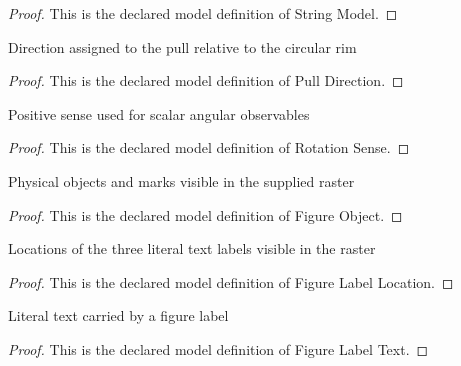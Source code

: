 \begin{proof}
  This is the declared model definition of String Model.
\end{proof}
\begin{definition}
  \label{def:physics:phyx-mini-0772:phyxminiproblems-problemphyxmini0772-pulldirection}
  Direction assigned to the pull relative to the circular rim
\end{definition}
\begin{proof}
  This is the declared model definition of Pull Direction.
\end{proof}
\begin{definition}
  \label{def:physics:phyx-mini-0772:phyxminiproblems-problemphyxmini0772-rotationsense}
  Positive sense used for scalar angular observables
\end{definition}
\begin{proof}
  This is the declared model definition of Rotation Sense.
\end{proof}
\begin{definition}
  \label{def:physics:phyx-mini-0772:phyxminiproblems-problemphyxmini0772-figureobject}
  Physical objects and marks visible in the supplied raster
\end{definition}
\begin{proof}
  This is the declared model definition of Figure Object.
\end{proof}
\begin{definition}
  \label{def:physics:phyx-mini-0772:phyxminiproblems-problemphyxmini0772-figurelabellocation}
  Locations of the three literal text labels visible in the raster
\end{definition}
\begin{proof}
  This is the declared model definition of Figure Label Location.
\end{proof}
\begin{definition}
  \label{def:physics:phyx-mini-0772:phyxminiproblems-problemphyxmini0772-figurelabeltext}
  Literal text carried by a figure label
\end{definition}
\begin{proof}
  This is the declared model definition of Figure Label Text.
\end{proof}
